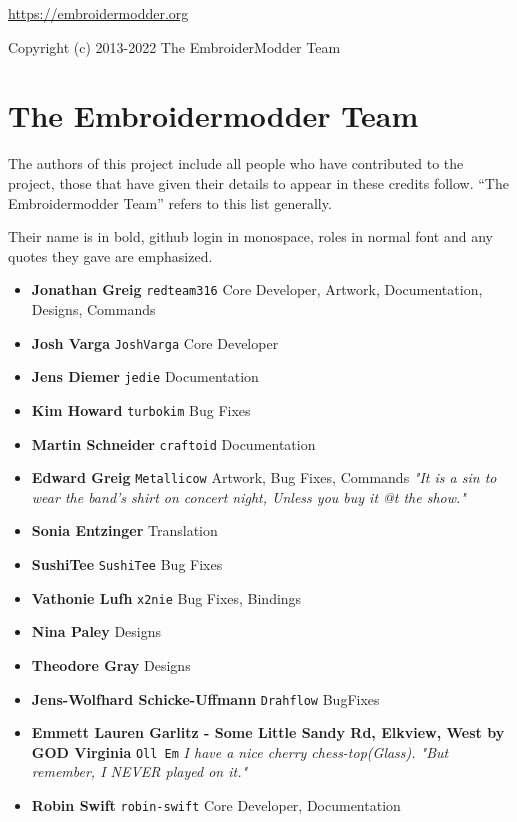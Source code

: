 \documentclass[a4paper, 11pt]{report}
\title{The Embroidermodder Project\\{\small \subtitle}}
\author{The Embroidermodder Team}
\begin{document}
\maketitle

\vspace{5in}

{\small
\url{https://embroidermodder.org}

Copyright (c) 2013-2022 The EmbroiderModder Team
}

\pagebreak

\tableofcontents

\pagebreak

\section*{The Embroidermodder Team}

The authors of this project include all people who have contributed to the project, those that have given their details to appear in these credits follow. 
``The Embroidermodder Team'' refers to this list generally.

Their name is in bold, github login in monospace, roles in normal font and any quotes they gave are emphasized.

\begin{itemize}
\item \textbf{Jonathan Greig} \texttt{redteam316} Core Developer, Artwork, Documentation, Designs, Commands
\item \textbf{Josh Varga} \texttt{JoshVarga} Core Developer
\item \textbf{Jens Diemer} \texttt{jedie} Documentation
\item \textbf{Kim Howard} \texttt{turbokim} Bug Fixes
\item \textbf{Martin Schneider} \texttt{craftoid} Documentation
\item \textbf{Edward Greig} \texttt{Metallicow} Artwork, Bug Fixes, Commands \emph{"It is a sin to wear the band's shirt on concert night, Unless you buy it @t the show."}
\item \textbf{Sonia Entzinger} Translation
\item \textbf{SushiTee} \texttt{SushiTee} Bug Fixes
\item \textbf{Vathonie Lufh} \texttt{x2nie} Bug Fixes, Bindings
\item \textbf{Nina Paley} Designs
\item \textbf{Theodore Gray} Designs
\item \textbf{Jens-Wolfhard Schicke-Uffmann} \texttt{Drahflow} BugFixes
\item \textbf{Emmett Lauren Garlitz - Some Little Sandy Rd, Elkview, West by GOD Virginia} \texttt{Oll Em} \textit{I have a nice cherry chess-top(Glass). "But remember, I NEVER played on it."}
\item \textbf{Robin Swift} \texttt{robin-swift} Core Developer, Documentation
\end{itemize}
\end{document}
